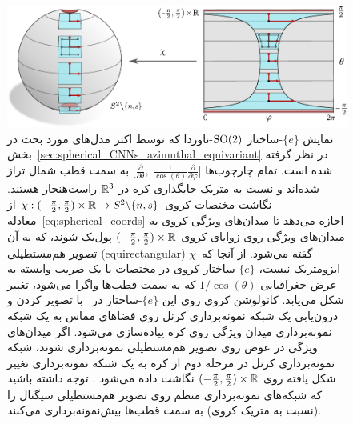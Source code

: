 \begin{figure}
    \centering
    \includegraphics[width=.90\textwidth]{figures/G_structure_spherical_equirectangular_1.pdf}
    \caption{\small
        نمایش $\{e\}$-ساختار $\operatorname{SO}(2)$-ناوردا که توسط اکثر مدل‌های مورد بحث در بخش~\ref{sec:spherical_CNNs_azimuthal_equivariant} در نظر گرفته شده است.
        تمام چارچوب‌ها
        $\big[ \frac{\partial}{\partial\theta} ,\; \frac{1}{\cos(\theta)} \frac{\partial}{\partial\varphi} \big]$
        به سمت قطب شمال تراز شده‌اند و نسبت به متریک جایگذاری کره در $\mathbb{R}^3$ راست‌هنجار هستند.
        نگاشت مختصات کروی
        $\chi: (-\frac{\pi}{2}, \frac{\pi}{2}) \times \mathbb{R} \to S^2 \backslash \{n,s\}$ از معادله~\eqref{eq:spherical_coords}
        اجازه می‌دهد تا میدان‌های ویژگی کروی به میدان‌های ویژگی روی زوایای کروی $(-\frac{\pi}{2}, \frac{\pi}{2}) \times \mathbb{R}$ پول‌بک شوند، که به آن تصویر هم‌مستطیلی (equirectangular) گفته می‌شود.
        از آنجا که~$\chi$ ایزومتریک نیست، $\{e\}$-ساختار کروی در مختصات با یک ضریب وابسته به عرض جغرافیایی $1/\cos(\theta)$ که به سمت قطب‌ها واگرا می‌شود، تغییر شکل می‌یابد.
        کانولوشن کروی روی این $\{e\}$-ساختار در~\cite{coors2018spherenet,eder2019convolutions,martin2020panoramic} با تصویر کردن و درون‌یابی یک شبکه نمونه‌برداری کرنل روی فضاهای مماس به یک شبکه نمونه‌برداری میدان ویژگی روی کره پیاده‌سازی می‌شود.
        اگر میدان‌های ویژگی در عوض روی تصویر هم‌مستطیلی نمونه‌برداری شوند، شبکه نمونه‌برداری کرنل در مرحله دوم از کره به یک شبکه نمونه‌برداری تغییر شکل یافته روی $(-\frac{\pi}{2}, \frac{\pi}{2}) \times \mathbb{R}$ نگاشت داده می‌شود \cite{zhao2018distortion,tateno2018distortion}.
        توجه داشته باشید که شبکه‌های نمونه‌برداری منظم روی تصویر هم‌مستطیلی سیگنال را (نسبت به متریک کروی) به سمت قطب‌ها بیش‌نمونه‌برداری می‌کنند.
    }
    \label{fig:spherical_equirectangular_1}
\end{figure}


